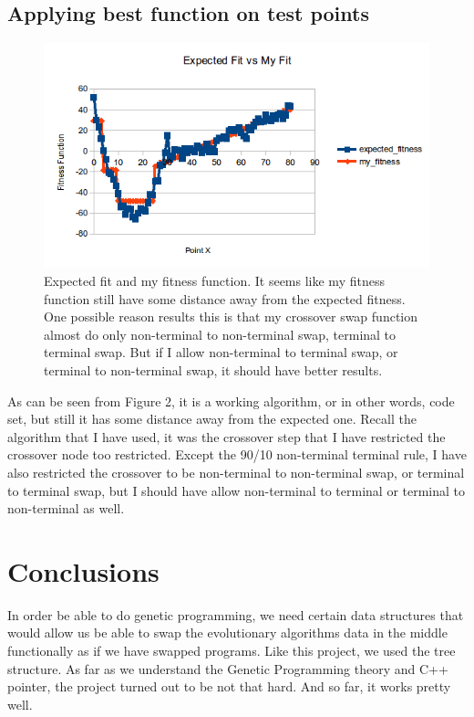 \documentclass[10pt,b5paper]{article}
\begin{document}
\subsection{Applying best function on test points}
\label{sec-2-2}
\begin{figure}[htb]
\centering
\includegraphics[width=.9\linewidth]{./fit.png}
\caption{Expected fit and my fitness function. It seems like my fitness function still have some distance away from the expected fitness. One possible reason results this is that my crossover swap function almost do only non-terminal to non-terminal swap, terminal to terminal swap. But if I allow non-terminal to terminal swap, or terminal to non-terminal swap, it should have better results.}
\end{figure}
As can be seen from Figure 2, it is a working algorithm, or in other words, code set, but still it has some distance away from the expected one. Recall the algorithm that I have used, it was the crossover step that I have restricted the crossover node too restricted. Except the 90/10 non-terminal terminal rule, I have also restricted the crossover to be non-terminal to non-terminal swap, or terminal to terminal swap, but I should have allow non-terminal to terminal or terminal to non-terminal as well. 
\section{Conclusions}
\label{sec-3}
In order be able to do genetic programming, we need certain data structures that would allow us be able to swap the evolutionary algorithms data in the middle functionally as if we have swapped programs. Like this project, we used the tree structure. As far as we understand the Genetic Programming theory and C++ pointer, the project turned out to be not that hard. And so far, it works pretty well. 
\end{document}
